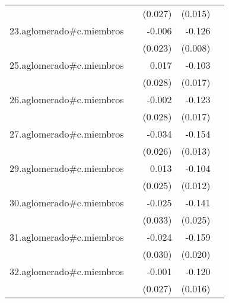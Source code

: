 {\begin{longtable}{l*{4}{D{.}{.}{-1}}}
            &                     &     (0.027)         &     (0.015)         &                     \\
\addlinespace
23.aglomerado#c.miembros&                     &      -0.006         &      -0.126\sym{***}&                     \\
            &                     &     (0.023)         &     (0.008)         &                     \\
\addlinespace
25.aglomerado#c.miembros&                     &       0.017         &      -0.103\sym{***}&                     \\
            &                     &     (0.028)         &     (0.017)         &                     \\
\addlinespace
26.aglomerado#c.miembros&                     &      -0.002         &      -0.123\sym{***}&                     \\
            &                     &     (0.028)         &     (0.017)         &                     \\
\addlinespace
27.aglomerado#c.miembros&                     &      -0.034         &      -0.154\sym{***}&                     \\
            &                     &     (0.026)         &     (0.013)         &                     \\
\addlinespace
29.aglomerado#c.miembros&                     &       0.013         &      -0.104\sym{***}&                     \\
            &                     &     (0.025)         &     (0.012)         &                     \\
\addlinespace
30.aglomerado#c.miembros&                     &      -0.025         &      -0.141\sym{***}&                     \\
            &                     &     (0.033)         &     (0.025)         &                     \\
\addlinespace
31.aglomerado#c.miembros&                     &      -0.024         &      -0.159\sym{***}&                     \\
            &                     &     (0.030)         &     (0.020)         &                     \\
\addlinespace
32.aglomerado#c.miembros&                     &      -0.001         &      -0.120\sym{***}&                     \\
            &                     &     (0.027)         &     (0.016)         &                     \\

\end{longtable}}
